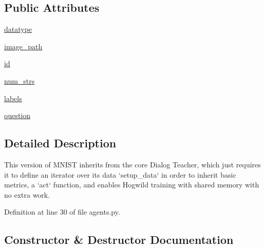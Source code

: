 \subsection*{Public Attributes}
\begin{DoxyCompactItemize}
\item 
\hyperlink{classparlai_1_1tasks_1_1mnist__qa_1_1agents_1_1MnistQATeacher_a813aa1c2a680e44e88ecb2832d99d51f}{datatype}
\item 
\hyperlink{classparlai_1_1tasks_1_1mnist__qa_1_1agents_1_1MnistQATeacher_a7c93f12d922a5f35699379983acfd5f0}{image\+\_\+path}
\item 
\hyperlink{classparlai_1_1tasks_1_1mnist__qa_1_1agents_1_1MnistQATeacher_a5f5642ab4593624e0f9a0a633deebf40}{id}
\item 
\hyperlink{classparlai_1_1tasks_1_1mnist__qa_1_1agents_1_1MnistQATeacher_aaee79511f7f1ec89e8701435e5b95036}{num\+\_\+strs}
\item 
\hyperlink{classparlai_1_1tasks_1_1mnist__qa_1_1agents_1_1MnistQATeacher_aa6621e4f56e5cdb9cb5d24bc439e2083}{labels}
\item 
\hyperlink{classparlai_1_1tasks_1_1mnist__qa_1_1agents_1_1MnistQATeacher_a79fbc5e429e1ee91b592fc6da4675c54}{question}
\end{DoxyCompactItemize}


\subsection{Detailed Description}
\begin{DoxyVerb}This version of MNIST inherits from the core Dialog Teacher, which just requires it
to define an iterator over its data `setup_data` in order to inherit basic metrics,
a `act` function, and enables Hogwild training with shared memory with no extra
work.
\end{DoxyVerb}
 

Definition at line 30 of file agents.\+py.



\subsection{Constructor \& Destructor Documentation}
\mbox{\label{classparlai_1_1tasks_1_1mnist__qa_1_1agents_1_1MnistQATeacher_a6ef124a2cc6ff3edc13291768fafbe29}} 
